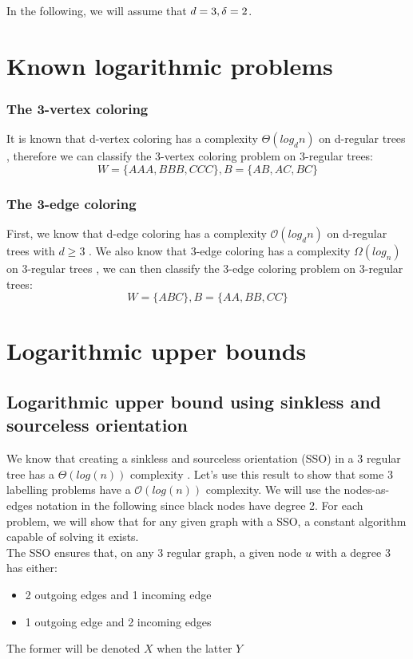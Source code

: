 In the following, we will assume that $d = 3, \delta = 2$.

\section{Known logarithmic problems}
\subsubsection{The 3-vertex coloring}
It is known that d-vertex coloring has a complexity $\Theta(log_dn)$ on d-regular trees \cite{DBLP:journals/corr/ChangKP16}, therefore we can classify the 3-vertex coloring problem on 3-regular trees: $$W = \{AAA,BBB,CCC\}, B =\{AB,AC,BC\}$$

\subsubsection{The 3-edge coloring}
First, we know that d-edge coloring has a complexity $\mathcal{O}(log_dn)$  on d-regular trees with $d\geq 3$ \cite{DBLP:journals/corr/abs-1708-04290}.
We also know that 3-edge coloring has a complexity $\Omega(log_n)$ on 3-regular trees \cite{balliu2019locality}, we can then classify the 3-edge coloring problem on 3-regular trees: $$W = \{ABC\}, B=\{AA,BB,CC\}$$

\section{Logarithmic upper bounds}
\subsection{Logarithmic upper bound using sinkless and sourceless orientation}
We know that creating a sinkless and sourceless orientation (SSO) in a 3 regular tree has a $\Theta(log(n))$ complexity \cite{1}. Let's use this result to show that some 3 labelling problems have a $\mathcal{O}(log(n))$ complexity. We will use the nodes-as-edges notation in the following since black nodes have degree 2. For each problem, we will show that for any given graph with a SSO, a constant algorithm capable of solving it exists.\\
The SSO ensures that, on any 3 regular graph, a given node $u$ with a degree 3 has either:
\begin{itemize}
    \item 2 outgoing edges and 1 incoming edge
    \item 1 outgoing edge and 2 incoming edges
\end{itemize}
The former will be denoted $X$ when the latter $Y$
